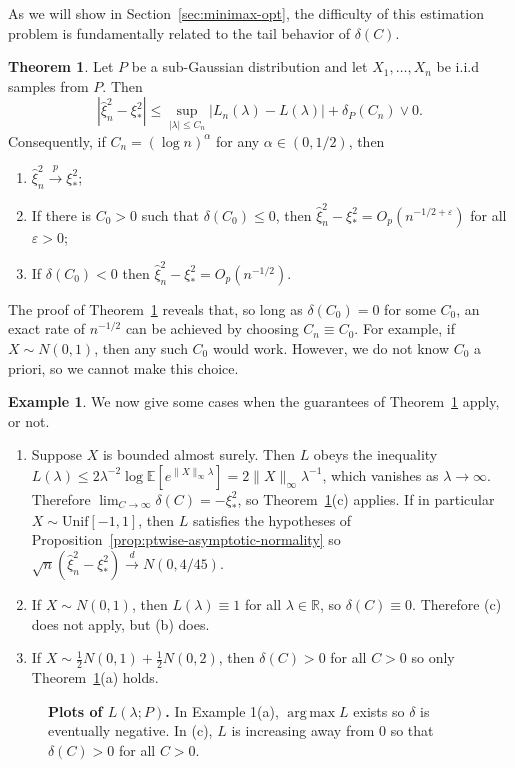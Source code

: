 \documentclass{article}
\theoremstyle{definition}
\newtheorem{theorem}{Theorem}
\newtheorem{example}{Example}
\newcommand*\eps{\epsilon}
\renewcommand*\epsilon{\varepsilon}
\newcommand{\R}{\mathbb{R}}
\newcommand{\E}{\mathbb{E}}
\newcommand{\1}{\mathbbm{1}}
\DeclareMathOperator*{\argmax}{arg\,max}
\begin{document}
As we will show in Section~\ref{sec:minimax-opt}, the difficulty of this estimation problem is fundamentally related to the tail behavior of $\delta(C)$.
\begin{theorem}
\label{prop:second-consistency}
    Let $P$ be a sub-Gaussian distribution and let $X_1, \ldots, X_n$ be i.i.d samples from $P$. Then 
    \[
    |\hat \xi^2_n - \xi_*^2| \leq \sup_{|\lambda| \leq C_n} |L_n(\lambda) - L(\lambda)| + \delta_P(C_n) \vee 0.
    \]
    Consequently, if $C_n = (\log n)^\alpha$ for any $\alpha \in (0, 1/2)$, then 
    \begin{enumerate}
        \item[(a)] $\hat \xi_n^2 \xrightarrow{p} \xi_*^2$; \item[(b)] If there is $C_0 > 0$  such that $\delta(C_0) \leq 0$, then $\hat \xi_n^2 - \xi_*^2 = O_p(n^{-1/2 + \eps})$ for all $\eps > 0$;
        \item[(c)] If $\delta(C_0) < 0$ then $\hat \xi^2_n - \xi^2_* = O_p(n^{-1/2})$.
    \end{enumerate}
\end{theorem}
The proof of Theorem~\ref{prop:second-consistency} reveals that, so long as $\delta(C_0) = 0$ for some $C_0$, an exact rate of $n^{-1/2}$ can be achieved by choosing $C_n \equiv C_0$. For example, if $X \sim N(0, 1)$, then any such $C_0$ would work. However, we do not know $C_0$ a priori, so we cannot make this choice.
\begin{example}
    
We now give some cases when the guarantees of Theorem~\ref{prop:second-consistency} apply, or not. 
\begin{enumerate}
    \item[(a)] Suppose $X$ is bounded almost surely. Then $L$ obeys the inequality $L(\lambda) \leq 2\lambda^{-2}\log \E[e^{\|X\|_\infty \lambda}] = 2\|X\|_\infty \lambda^{-1}$,
        which vanishes as $\lambda \to \infty$. Therefore $\lim_{C \to \infty}\delta(C) = -\xi_*^2$, so Theorem~\ref{prop:second-consistency}(c) applies. If in particular $X \sim \text{Unif}[-1 ,1]$, then $L$ satisfies the hypotheses of Proposition~\ref{prop:ptwise-asymptotic-normality} so $\sqrt n(\hat \xi_n^2 - \xi_*^2) \xrightarrow{d}  N(0, 4/45)$.
        
\item[(b)] If $X \sim N(0, 1)$, then $L(\lambda) \equiv 1$ for all $\lambda \in \R$, so $\delta(C) \equiv 0$. Therefore (c) does not apply, but (b) does.

\item[(c)] If $X \sim \frac12N(0, 1) + \frac12N(0, 2)$, then $\delta(C) > 0$ for all $C > 0$ so only Theorem~\ref{prop:second-consistency}(a) holds.
\end{enumerate}
\end{example}
\begin{figure}[h]
    \centering
    \resizebox{0.45\linewidth}{!}{}
    \caption{\textbf{Plots of $L(\lambda; P)$.} In Example 1(a), $\argmax L$ exists so $\delta$ is eventually negative. In (c), $L$ is increasing away from 0 so that $\delta(C) > 0$ for all $C > 0$.}
    \label{fig:placeholder}
\end{figure}
\end{document}
